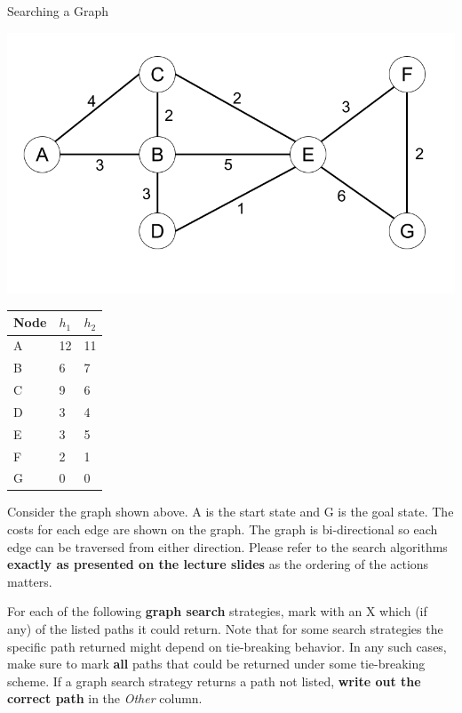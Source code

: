 \begin{problem}{Searching a Graph}

\begin{table}[h]
\centering
\begin{minipage}{0.45\linewidth}
\includegraphics[scale=0.3]{figures/graph2.png} 
\end{minipage}
\hspace{1.5cm}
\begin{minipage}{0.45\linewidth}
\begin{tabular}{|l|l|l|}
\hline
Node & $h_1$ & $h_2$\\
\hline
A &12 &11\\
B &6 &7\\
C &9 &6\\
D &3 &4\\
E &3 &5\\
F &2 &1\\
G &0 &0\\
\hline
\end{tabular}
\end{minipage}
\end{table}

Consider the graph shown above. A is the start state and G is the goal state. The costs for each edge are shown on the graph. The graph is bi-directional so each edge can be traversed from either direction. Please refer to the search algorithms \textbf{exactly as presented on the lecture slides} as the ordering of the actions matters.

\begin{question}[15]
For each of the following \textbf{graph search} strategies, mark with an X which (if any) of the listed paths it could return. Note that for some search strategies the specific path returned might depend on tie-breaking behavior. In any such cases, make sure to mark \textbf{all} paths that could be returned under some tie-breaking scheme. If a graph search strategy returns a path not listed, \textbf{write out the correct path} in the \textit{Other} column.\\



\end{question}
\end{problem}

